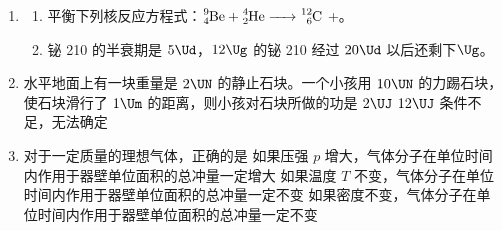 \documentclass[\gkver]{gaokaozhenti}
\begin{document}
\begin{enumerate}


\item
\begin{enumerate}
	\item
	平衡下列核反应方程式：$\ce{^{9}_{4}Be + ^{4}_{2}He -> ^{12}_{6}C}$ +。
	\item
	铋 210 的半衰期是 $5\Ud$，$12\Ug$ 的铋 210 经过 $20\Ud$ 以后还剩下$\Ug$。
\end{enumerate}



\item
水平地面上有一块重量是 $2\UN$ 的静止石块。一个小孩用 $10\UN$ 的力踢石块，使石块滑行了 $1\Um$ 的距离，则小孩对石块所做的功是
\fourchoices[answer=D]
{$10\UJ$}
{$2\UJ$}
{$12\UJ$}
{条件不足，无法确定}


\item
对于一定质量的理想气体，正确的是
{如果压强 $p$ 增大，气体分子在单位时间内作用于器壁单位面积的总冲量一定增大}
{如果温度 $T$ 不变，气体分子在单位时间内作用于器壁单位面积的总冲量一定不变}
{如果密度不变，气体分子在单位时间内作用于器壁单位面积的总冲量一定不变}


\end{enumerate}
\end{document}

